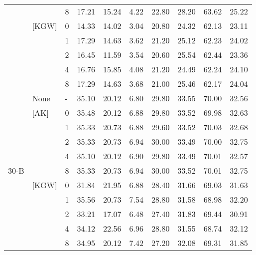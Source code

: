\begin{table}[H]
{\begin{tabular}{lllrrrrrrr}
     &  & 8 & 17.21 & 15.24 & 4.22 & 22.80 & 28.20 & 63.62 & 25.22 \\
     \cmidrule{2-10} 
     & [KGW] & 0 & 14.33 & 14.02 & 3.04 & 20.80 & 24.32 & 62.13 & 23.11 \\
     &  & 1 & 17.29 & 14.63 & 3.62 & 21.20 & 25.12 & 62.23 & 24.02 \\
     &  & 2 & 16.45 & 11.59 & 3.54 & 20.60 & 25.54 & 62.44 & 23.36 \\
     &  & 4 & 16.76 & 15.85 & 4.08 & 21.20 & 24.49 & 62.24 & 24.10 \\
     &  & 8 & 17.29 & 14.63 & 3.68 & 21.00 & 25.46 & 62.17 & 24.04 \\
     \midrule
    \multirow[t]{14}{*}{30-B} 
     & None & - & 35.10 & 20.12 & 6.80 & 29.80 & 33.55 & 70.00 & 32.56 \\
     \cmidrule{2-10} 
     & [AK] & 0 & 35.48 & 20.12 & 6.88 & 29.80 & 33.52 & 69.98 & 32.63 \\
     & & 1 & 35.33 & 20.73 & 6.88 & 29.60 & 33.52 & 70.03 & 32.68 \\
     & & 2 & 35.33 & 20.73 & 6.94 & 30.00 & 33.49 & 70.00 & 32.75 \\
     & & 4 & 35.10 & 20.12 & 6.90 & 29.80 & 33.49 & 70.01 & 32.57 \\
     & & 8 & 35.33 & 20.73 & 6.94 & 30.00 & 33.52 & 70.01 & 32.75 \\
     \cmidrule{2-10} 
     & [KGW] & 0 & 31.84 & 21.95 & 6.88 & 28.40 & 31.66 & 69.03 & 31.63 \\
     &  & 1 & 35.56 & 20.73 & 7.54 & 28.80 & 31.58 & 68.98 & 32.20 \\
     &  & 2 & 33.21 & 17.07 & 6.48 & 27.40 & 31.83 & 69.44 & 30.91 \\
     &  & 4 & 34.12 & 22.56 & 6.96 & 28.80 & 31.55 & 68.74 & 32.12 \\
     &  & 8 & 34.95 & 20.12 & 7.42 & 27.20 & 32.08 & 69.31 & 31.85 \\
    \bottomrule
    \end{tabular}
    }
\end{table}





